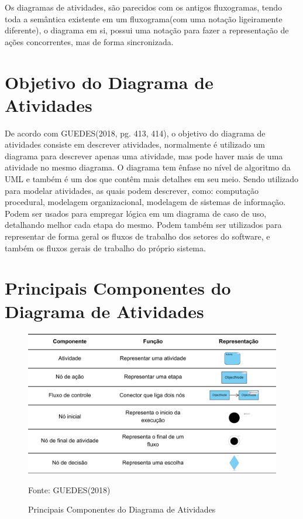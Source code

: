 \documentclass[12pt,openright,oneside,a4paper,
	chapter=TITLE,
	section=TITLE,
	english,brazil]{abntex2}
\begin{document}
Os diagramas de atividades, são parecidos com os antigos fluxogramas, tendo toda a semântica existente em um fluxograma(com uma notação ligeiramente diferente), o diagrama em si, possui uma notação para fazer a representação de ações concorrentes, mas de forma sincronizada.

\section{Objetivo do Diagrama de Atividades}

De acordo com GUEDES(2018, pg. 413, 414), o objetivo do diagrama de atividades consiste em descrever atividades, normalmente é utilizado um diagrama para descrever apenas uma atividade, mas pode haver mais de uma atividade no mesmo diagrama. O diagrama tem ênfase no nível de algoritmo da UML e também é um dos que contêm mais detalhes em seu meio. Sendo utilizado para modelar atividades, as quais podem descrever, como: computação procedural, modelagem organizacional, modelagem de sistemas de informação. Podem ser usados para empregar lógica em um diagrama de caso de uso, detalhando melhor cada etapa do mesmo. Podem também ser utilizados para representar de forma geral os fluxos de trabalho dos setores do software, e também os fluxos gerais de trabalho do próprio sistema.

\pagebreak
\section{Principais Componentes do Diagrama de Atividades}

\begin{figure}[!htp]
	\caption{Principais Componentes do Diagrama de Atividades}
	\centering
	\includegraphics[scale=0.2]{img/PrincipaisCompAtividades.png}
	\\

	\footnotesize\raggedright Fonte: GUEDES(2018)
\end{figure}
\end{document}
